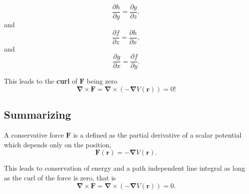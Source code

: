\documentclass[%
oneside,                 %
final,                   %
10pt]{article}
\begin{document}
\[
\frac{\partial h}{\partial y}=\frac{\partial g}{\partial z},
\]
and
\[
\frac{\partial f}{\partial z}=\frac{\partial h}{\partial x},
\]
and
\[
\frac{\partial g}{\partial x}=\frac{\partial f}{\partial y}.
\]

This leads to the \textbf{curl} of $\bm{F}$ being zero
\[
\bm{\nabla}\times\bm{F}=\bm{\nabla}\times\left(-\bm{\nabla}V(\bm{r})\right)=0!
\]

\subsection{Summarizing}

A conservative force $\bm{F}$ is a defined as the partial derivative of a scalar potential which depends only on the position,
\[
\bm{F}(\bm{r})= -\bm{\nabla}V(\bm{r}).
\]

This leads to conservation of energy and a path independent line integral as long as the curl of the force is zero, that is
\[
\bm{\nabla}\times\bm{F}=\bm{\nabla}\times\left(-\bm{\nabla}V(\bm{r})\right)=0.
\]


\end{document}
